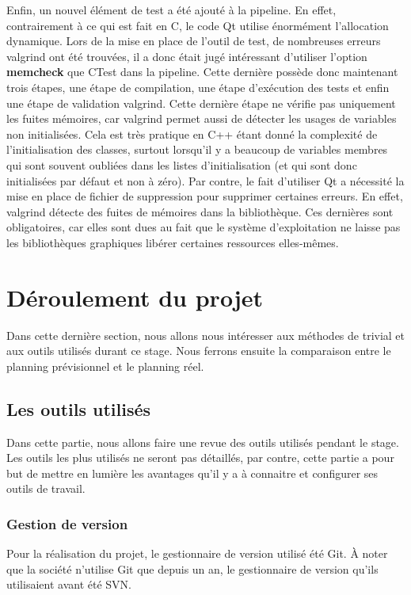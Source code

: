 \documentclass[a4paper]{article}
\begin{document}
Enfin, un nouvel élément de test a été ajouté à la pipeline. En effet,
contrairement à ce qui est fait en C, le code Qt utilise énormément l'allocation
dynamique. Lors de la mise en place de l'outil de test, de nombreuses erreurs
valgrind ont été trouvées, il a donc était jugé intéressant d'utiliser
l'option \textbf{memcheck} que CTest dans la pipeline. Cette dernière possède
donc maintenant trois étapes, une étape de compilation, une étape d'exécution des
tests et enfin une étape de validation valgrind. Cette dernière étape ne vérifie
pas uniquement les fuites mémoires, car valgrind permet aussi de détecter les
usages de variables non initialisées. Cela est très pratique en C++ étant donné
la complexité de l'initialisation des classes, surtout lorsqu'il y a beaucoup de
variables membres qui sont souvent oubliées dans les listes d'initialisation (et
qui sont donc initialisées par défaut et non à zéro). Par contre, le fait
d'utiliser Qt a nécessité la mise en place de fichier de suppression pour
supprimer certaines erreurs. En effet, valgrind détecte des fuites de mémoires
dans la bibliothèque. Ces dernières sont obligatoires, car elles sont dues au fait
que le système d'exploitation ne laisse pas les bibliothèques graphiques libérer
certaines ressources elles-mêmes.
\section{Déroulement du projet}%

Dans cette dernière section, nous allons nous intéresser aux méthodes de
trivial et aux outils utilisés durant ce stage. Nous ferrons ensuite la
comparaison entre le planning prévisionnel et le planning réel.

\subsection{Les outils utilisés}%

Dans cette partie, nous allons faire une revue des outils utilisés pendant le
stage. Les outils les plus utilisés ne seront pas détaillés, par contre, cette
partie a pour but de mettre en lumière les avantages qu'il y a à connaitre et
configurer ses outils de travail.

\subsubsection{Gestion de version}%

Pour la réalisation du projet, le gestionnaire de version utilisé été Git. À
noter que la société n'utilise Git que depuis un an, le gestionnaire de version
qu'ils utilisaient avant été SVN.
\end{document}
